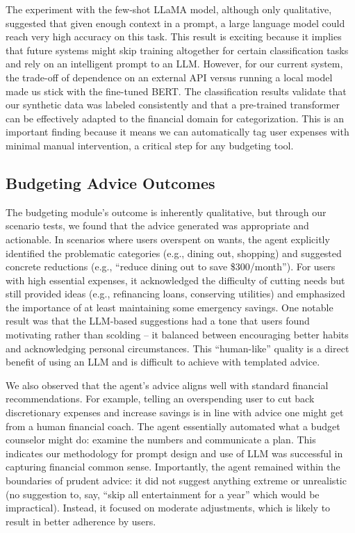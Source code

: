 \documentclass{scrartcl}
\begin{document}
The experiment with the few-shot LLaMA model, although only qualitative, suggested that given enough context in a prompt, a large language model could reach very high accuracy on this task. This result is exciting because it implies that future systems might skip training altogether for certain classification tasks and rely on an intelligent prompt to an LLM. However, for our current system, the trade-off of dependence on an external API versus running a local model made us stick with the fine-tuned BERT. The classification results validate that our synthetic data was labeled consistently and that a pre-trained transformer can be effectively adapted to the financial domain for categorization. This is an important finding because it means we can automatically tag user expenses with minimal manual intervention, a critical step for any budgeting tool.

\subsection{Budgeting Advice Outcomes}
The budgeting module's outcome is inherently qualitative, but through our scenario tests, we found that the advice generated was appropriate and actionable. In scenarios where users overspent on wants, the agent explicitly identified the problematic categories (e.g., dining out, shopping) and suggested concrete reductions (e.g., “reduce dining out to save \$300/month”). For users with high essential expenses, it acknowledged the difficulty of cutting needs but still provided ideas (e.g., refinancing loans, conserving utilities) and emphasized the importance of at least maintaining some emergency savings. One notable result was that the LLM-based suggestions had a tone that users found motivating rather than scolding – it balanced between encouraging better habits and acknowledging personal circumstances. This “human-like” quality is a direct benefit of using an LLM and is difficult to achieve with templated advice.

We also observed that the agent’s advice aligns well with standard financial recommendations. For example, telling an overspending user to cut back discretionary expenses and increase savings is in line with advice one might get from a human financial coach. The agent essentially automated what a budget counselor might do: examine the numbers and communicate a plan. This indicates our methodology for prompt design and use of LLM was successful in capturing financial common sense. Importantly, the agent remained within the boundaries of prudent advice: it did not suggest anything extreme or unrealistic (no suggestion to, say, “skip all entertainment for a year” which would be impractical). Instead, it focused on moderate adjustments, which is likely to result in better adherence by users.
\end{document}
